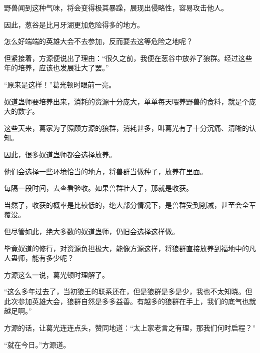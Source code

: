 \begin{this_body}
野兽闻到这种气味，将会变得极其暴躁，展现出侵略性，容易攻击他人。

因此，葱谷是比月牙湖更加危险得多的地方。

怎么好端端的英雄大会不去参加，反而要去这等危险之地呢？

但紧接着，方源便说出了理由：“很久之前，我便在葱谷中放养了狼群。经过这些年的培养，应该也发展壮大了罢。”

“原来是这样！”葛光顿时眼前一亮。

奴道蛊师要培养出来，消耗的资源十分庞大，单单每天喂养野兽的食料，就是个庞大的数字。

这些天来，葛家为了照顾方源的狼群，消耗甚多，叫葛光有了十分沉痛、清晰的认知。

因此，很多奴道蛊师都会选择放养。

他们会选择一些环境恰当的地方，将兽群当做种子，放养在里面。

每隔一段时间，去查看验收。如果兽群壮大了，那就是收获。

当然了，收获的概率是比较低的，绝大部分情况下，是兽群受到削减，甚至会全军覆没。

但尽管如此，绝大多数的奴道蛊师，仍旧会选择这样做。

毕竟奴道的修行，对资源负担极大，能像方源这样，将狼群直接放养到福地中的凡人蛊师，能有多少呢？

方源这么一说，葛光顿时理解了。

“这么多年过去了，当初狼王的联系还在，但是狼群是多是少，我也不太知晓。但此次参加英雄大会，狼群自然是多多益善。有越多的狼群在手上，我们的底气也就越足啊。”

方源的话，让葛光连连点头，赞同地道：“太上家老言之有理，那我们何时启程？”

“就在今日。”方源道。

\end{this_body}

